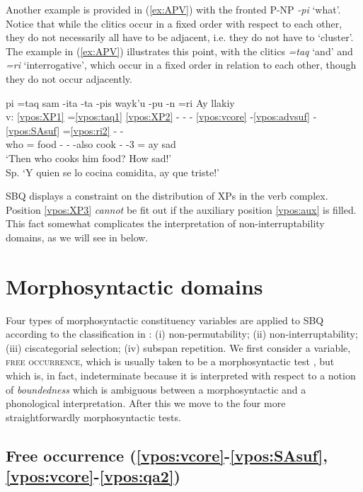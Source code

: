 \documentclass[output=paper]{langscibook}
\begin{document}
Another example is provided in (\ref{ex:APV}) with the fronted P-NP \textit{-pi} `what'. Notice that while the clitics occur in a fixed order with respect to each other, they do not necessarily all have to be adjacent, i.e. they do not have to `cluster'. The example in (\ref{ex:APV}) illustrates this point, with the clitics \textit{=taq} `and' and \textit{=ri} `interrogative', which occur in a fixed order in relation to each other, though they do not occur adjacently.

\ea \label{ex:APV}{
	\glll {} pi =taq sam -ita -ta -pis wayk'u -pu -n =ri Ay llakiy  \\
        v: \ref{vpos:XP1} =\ref{vpos:taq1} \ref{vpos:XP2} - - - \ref{vpos:vcore} -\ref{vpos:advsuf} -\ref{vpos:SAsuf} =\ref{vpos:ri2} - -  \\
	    {} who =\Conj{} food -\Dim{} -\Acc{} -also cook -\Ben{} -3\Sg{} =\Inter{} ay sad   \\
	\glt `Then who cooks him food? How sad!' \\ Sp. `Y quien se lo cocina comidita, ay que triste!'
	\hfill }
\z

SBQ displays a constraint on the distribution of XPs in the verb complex. Position \ref{vpos:XP3} \textit{cannot} be fit out if the auxiliary position \ref{vpos:aux} is filled. This fact somewhat complicates the interpretation of non-interruptability domains, as we will see in  below.


\section{Morphosyntactic domains} %
\label{sbq:sec:morphosyntacticdomains}

Four types of morphosyntactic constituency variables are applied to SBQ according to the classification in \citet{tallmancoincidence:2020}: (i) non-permutability; (ii) non-interruptability; (iii) ciscategorial selection; (iv) subspan repetition. 
We first consider a variable, \textsc{free occurrence}, which is usually taken to be a morphosyntactic test \citep{haspelmathword:2011}, but which is, in fact, indeterminate because it is interpreted with respect to a notion of \textit{boundedness} which is ambiguous between a morphosyntactic and a phonological interpretation. After this we move to the four more straightforwardly morphosyntactic tests.

\subsection{Free occurrence (\ref{vpos:vcore}-\ref{vpos:SAsuf}, \ref{vpos:vcore}-\ref{vpos:qa2})}
\label{sbq:sec:freeoccurrence}
\end{document}
